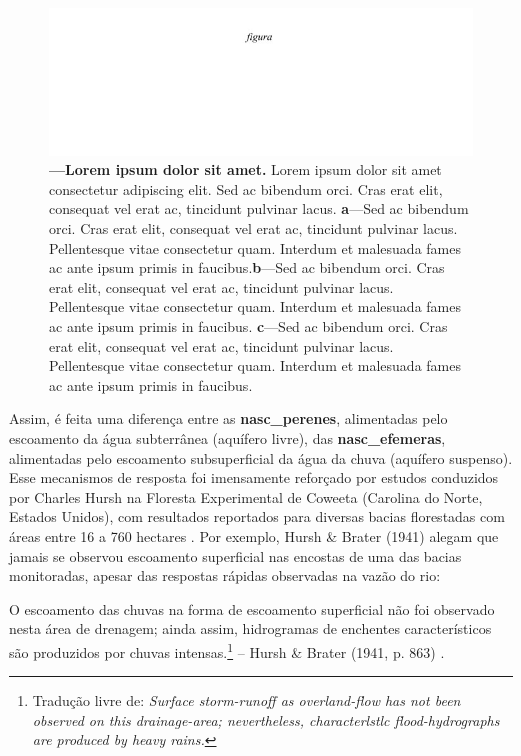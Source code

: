 \documentclass[./main.tex]{subfiles}
\begin{document}
\begin{figure}[t!] 
\centering				
\includegraphics[width=0.95\linewidth]{figs/fig_p.jpg}		
\caption[Lorem ipsum dolor sit amet]
{\textbf{---\;Lorem ipsum dolor sit amet.}
    Lorem ipsum dolor sit amet consectetur adipiscing elit. Sed ac bibendum orci. Cras erat elit, consequat vel erat ac, tincidunt pulvinar lacus. \;\textbf{a}\;---\;Sed ac bibendum orci. Cras erat elit, consequat vel erat ac, tincidunt pulvinar lacus. Pellentesque vitae consectetur quam. Interdum et malesuada fames ac ante ipsum primis in faucibus.\;\textbf{b}\;---\;Sed ac bibendum orci. Cras erat elit, consequat vel erat ac, tincidunt pulvinar lacus. Pellentesque vitae consectetur quam. Interdum et malesuada fames ac ante ipsum primis in faucibus. \;\textbf{c}\;---\;Sed ac bibendum orci. Cras erat elit, consequat vel erat ac, tincidunt pulvinar lacus. Pellentesque vitae consectetur quam. Interdum et malesuada fames ac ante ipsum primis in faucibus.
}
\label{fig:hydro:macro} 		
\end{figure}

\noindent Assim, é feita uma diferença entre as \textbf{\gls{nasc_perenes}}, alimentadas pelo escoamento da água subterrânea  (aquífero livre), das \textbf{\gls{nasc_efemeras}}, alimentadas pelo escoamento subsuperficial da água da chuva (aquífero suspenso). Esse mecanismos de resposta foi imensamente reforçado por estudos conduzidos por Charles Hursh na Floresta Experimental de Coweeta (Carolina do Norte, Estados Unidos), com resultados reportados para diversas bacias florestadas com áreas entre 16 a 760 hectares \cite{Hoover1943, Hursh1944}. Por exemplo, Hursh \& Brater (1941) \cite{Hursh1941} alegam que jamais se observou escoamento superficial nas encostas de uma das bacias monitoradas, apesar das respostas rápidas observadas na vazão do rio: 

\begin{adjustwidth}{100pt}{0pt}
\medskip
\small O escoamento das chuvas na forma de escoamento superficial não foi observado nesta área de drenagem; ainda assim, hidrogramas de enchentes característicos são produzidos por chuvas intensas.\footnote{Tradução livre de: \textit{Surface storm-runoff as overland-flow has not been observed on this drainage-area; nevertheless, characterlstlc flood-hydrographs are produced by heavy rains.}} -- Hursh \& Brater (1941, p. 863) \cite{Hursh1941}.
\medskip
\end{adjustwidth}
\end{document}
